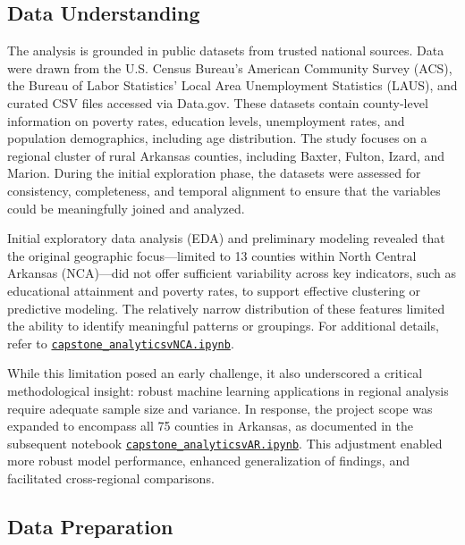 \documentclass{llncs}
\begin{document}
\subsection{Data Understanding}
The analysis is grounded in public datasets from trusted national sources. Data were drawn from the U.S. Census Bureau’s American Community Survey (ACS), the Bureau of Labor Statistics’ Local Area Unemployment Statistics (LAUS), and curated CSV files accessed via Data.gov. These datasets contain county-level information on poverty rates, education levels, unemployment rates, and population demographics, including age distribution. The study focuses on a regional cluster of rural Arkansas counties, including Baxter, Fulton, Izard, and Marion. During the initial exploration phase, the datasets were assessed for consistency, completeness, and temporal alignment to ensure that the variables could be meaningfully joined and analyzed.

\begin{tcolorbox}[colback=gray!10,colframe=black,title=Developer Note: From NCA Regional to Statewide Scope]
Initial exploratory data analysis (EDA) and preliminary modeling revealed that the original geographic focus—limited to 13 counties within North Central Arkansas (NCA)—did not offer sufficient variability across key indicators, such as educational attainment and poverty rates, to support effective clustering or predictive modeling. The relatively narrow distribution of these features limited the ability to identify meaningful patterns or groupings. For additional details, refer to \href{run:capstone_analyticsvNCA.ipynb}{\texttt{capstone\_analyticsvNCA.ipynb}}.

While this limitation posed an early challenge, it also underscored a critical methodological insight: robust machine learning applications in regional analysis require adequate sample size and variance. In response, the project scope was expanded to encompass all 75 counties in Arkansas, as documented in the subsequent notebook \href{run:capstone_analyticsvAR.ipynb}{\texttt{capstone\_analyticsvAR.ipynb}}. This adjustment enabled more robust model performance, enhanced generalization of findings, and facilitated cross-regional comparisons.
\end{tcolorbox}

\subsection{Data Preparation} \label{subsec:data_preparation}
\end{document}
